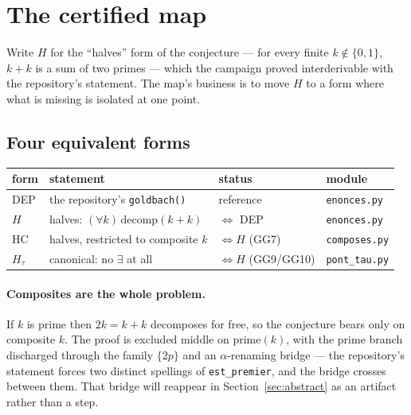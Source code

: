 \documentclass[11pt]{article}
\theoremstyle{remark}\newtheorem{remark}{Remark}
\begin{document}
\section{The certified map}
\label{sec:map}

Write $H$ for the ``halves'' form of the conjecture --- for every finite $k \notin
\{0,1\}$, $k+k$ is a sum of two primes --- which the campaign proved interderivable
with the repository's statement. The map's business is to move $H$ to a form where
what is missing is isolated at one point.

\subsection{Four equivalent forms}

\begin{center}
\begin{tabular}{@{}llll@{}}
\toprule
form & statement & status & module \\
\midrule
DEP & the repository's \texttt{goldbach()} & reference & \texttt{enonces.py} \\
$H$ & halves: $(\forall k)\,\mathrm{decomp}(k{+}k)$ & $\Leftrightarrow$ DEP & \texttt{enonces.py} \\
HC & halves, restricted to composite $k$ & $\Leftrightarrow H$ (GG7) & \texttt{composes.py} \\
$H_\tau$ & canonical: no $\exists$ at all & $\Leftrightarrow H$ (GG9/GG10) & \texttt{pont\_tau.py} \\
\bottomrule
\end{tabular}
\end{center}

\paragraph{Composites are the whole problem.} If $k$ is prime then $2k = k+k$ decomposes
for free, so the conjecture bears only on composite $k$. The proof is excluded middle on
$\mathrm{prime}(k)$, with the prime branch discharged through the family $\{2p\}$ and an
$\alpha$-renaming bridge --- the repository's statement forces two distinct spellings of
\texttt{est\_premier}, and the bridge crosses between them. That bridge will reappear in
Section~\ref{sec:abstract} as an artifact rather than a step.
\end{document}
